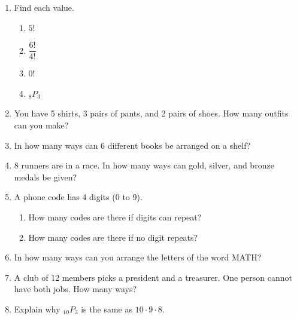 \documentclass[11pt]{article}
\begin{document}
\begin{enumerate}

\item Find each value.
\begin{enumerate}[itemsep=1.4em]
  \item $5!$ 
  \item $\dfrac{6!}{4!}$ 
  \item $0!$ 
  \item ${}_8P_3$ 
\end{enumerate}
\work{1em}

\item You have 5 shirts, 3 pairs of pants, and 2 pairs of shoes. How many outfits can you make?

\work{2.5em}

\item In how many ways can 6 different books be arranged on a shelf?

\work{2.5em}

\item 8 runners are in a race. In how many ways can gold, silver, and bronze medals be given?

\work{2.5em}

\newpage
\item A phone code has 4 digits (0 to 9).
\begin{enumerate}[itemsep=1em]
  \item How many codes are there if digits can repeat? 
  \work{1.5em}
  \item How many codes are there if no digit repeats? 
\end{enumerate}
\work{2em}

\item In how many ways can you arrange the letters of the word MATH? 
\work{2.5em}

\item A club of 12 members picks a president and a treasurer. One person cannot have both jobs. How many ways?

\work{2.5em}

\item Explain why ${}_{10}P_3$ is the same as $10 \cdot 9 \cdot 8$.


\end{enumerate}
\end{document}
